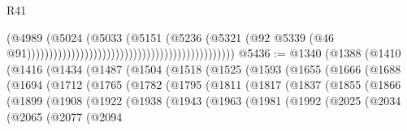 \begin{lexlean}{R41}
\begin{coremodule}
                                                                                  (@4989
                                                                                    (@5024
                                                                                      (@5033
                                                                                        (@5151
                                                                                          (@5236
                                                                                            (@5321
                                                                                              (@92
                                                                                                @5339
                                                                                                (@46
                                                                                                  @91)))))))))))))))))))))))))))))))))))))))))))))))
@5436 := @1340
    (@1388
      (@1410
        (@1416
          (@1434
            (@1487
              (@1504
                (@1518
                  (@1525
                    (@1593
                      (@1655
                        (@1666
                          (@1688
                            (@1694
                              (@1712
                                (@1765
                                  (@1782
                                    (@1795
                                      (@1811
                                        (@1817
                                          (@1837
                                            (@1855
                                              (@1866
                                                (@1899
                                                  (@1908
                                                    (@1922
                                                      (@1938
                                                        (@1943
                                                          (@1963
                                                            (@1981
                                                              (@1992
                                                                (@2025
                                                                  (@2034
                                                                    (@2065
                                                                      (@2077
                                                                        (@2094

\end{coremodule}
\end{lexlean}
